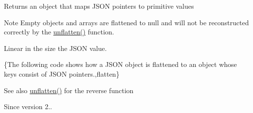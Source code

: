 \begin{DoxyReturn}{Returns}
an object that maps J\+S\+ON pointers to primitive values
\end{DoxyReturn}
\begin{DoxyNote}{Note}
Empty objects and arrays are flattened to {\ttfamily null} and will not be reconstructed correctly by the \mbox{\hyperlink{classnlohmann_1_1basic__json_a74fa3ab2003f2f6f2b69deaafed9126d}{unflatten()}} function.
\end{DoxyNote}
Linear in the size the J\+S\+ON value.

\{The following code shows how a J\+S\+ON object is flattened to an object whose keys consist of J\+S\+ON pointers.,flatten\}

\begin{DoxySeeAlso}{See also}
\mbox{\hyperlink{classnlohmann_1_1basic__json_a74fa3ab2003f2f6f2b69deaafed9126d}{unflatten()}} for the reverse function
\end{DoxySeeAlso}
\begin{DoxySince}{Since}
version 2.. 
\end{DoxySince}
\mbox{\label{classnlohmann_1_1basic__json_a0524486cd0b36a47448df882ec0d5e7b}} 
